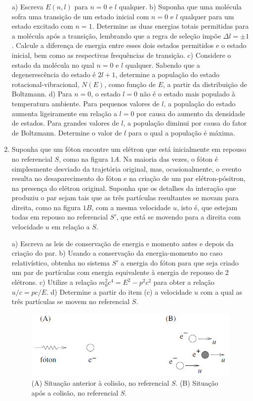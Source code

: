 \begin{enumerate}[start=1,label={\bfseries Q\arabic*.}]
a) Escreva $E(n,l)$ para $n = 0$ e $l$ qualquer.
b) Suponha que uma molécula sofra uma transição de um estado inicial com $n = 0$ e $l$ qualquer para um estado excitado com $n = 1$. Determine as duas energias totais permitidas para a molécula após a transição, lembrando que a regra de seleção impõe $\Delta l = \pm 1$. Calcule a diferença de energia entre esses dois estados permitidos e o estado inicial, bem como as respectivas frequências de transição.
c) Considere o estado da molécula no qual $n = 0$ e $l$ qualquer. Sabendo que a degenerescência do estado é $2l + 1$, determine a população do estado rotacional-vibracional, $N(E)$, como função de $E$, a partir da distribuição de Boltzmann.
d) Para $n = 0$, o estado $l = 0$ não é o estado mais populado à temperatura ambiente. Para pequenos valores de $l$, a população do estado aumenta ligeiramente em relação a $l = 0$ por causa do aumento da densidade de estados. Para grandes valores de $l$, a população diminui por causa do fator de Boltzmann. Determine o valor de $l$ para o qual a população é máxima.



\item Suponha que um fóton encontre um elétron que está inicialmente em repouso no referencial $S$, como na figura $1A$. Na maioria das vezes, o fóton é simplesmente desviado da trajetória original, mas, ocasionalmente, o evento resulta no desaparecimento do fóton e na criação de um par elétron-pósitron, na presença do elétron original. Suponha que os detalhes da interação que produziu o par sejam tais que as três partículas resultantes se movam para direita, como na figura $1B$, com a mesma velocidade $u$, isto é, que estejam todas em repouso no referencial $S'$, que está se movendo para a direita com velocidade $u$ em relação a $S$.


a) Escreva as leis de conservação de energia e momento antes e depois da criação do par.
b) Usando a conservação da energia-momento no caso relativístico, obtenha no sistema $S'$ a energia do fóton para que seja criado um par de partículas com energia equivalente à energia de repouso de 2 elétrons.
c) Utilize a relação $m^{2}_{0} c^{4} = E^{2} - p^{2}c^{2}$ para obter a relação $u/c = pc/E$.
d) Determine a partir do item (c) a velocidade $u$ com a qual as três partículas se movem no referencial $S$.

%
\begin{figure}[H]
  \centering
  \includegraphics[scale=0.8]{moderna-img/particula.png}
  \caption{(A) Situação anterior à colisão, no referencial $S$. (B) Situação após a colisão, no referencial $S$.}
\end{figure}



\end{enumerate}

